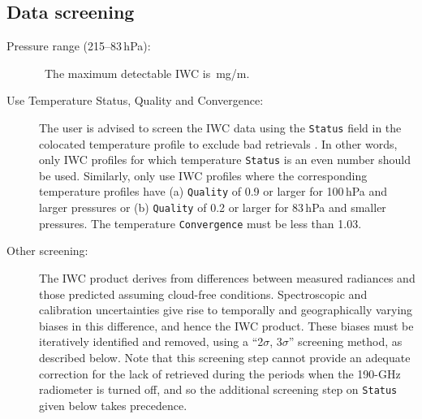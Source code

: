 \begin{nofloatpages}
\subsection{Data screening}
\label{sec:IWCScreening}
\begin{description}
  \item[Pressure range (215--83\,hPa):] \standardrangestatement\ The maximum detectable IWC is \,mg/m.
  \item[Use Temperature Status, Quality and Convergence:] The user is advised to screen the IWC data using the \texttt{Status} field in the colocated temperature profile to exclude bad retrievals \citep{SchwartzEtal:2008:Validation}. In other words, only IWC profiles for which temperature \texttt{Status} is an even number should be used. Similarly, only use IWC profiles where the corresponding temperature profiles have (a) \texttt{Quality} of 0.9 or larger for 100\,hPa and larger pressures or (b) \texttt{Quality} of 0.2 or larger for 83\,hPa and smaller pressures. The temperature \texttt{Convergence} must be less than 1.03.
  \item[Other screening:] The IWC product derives from differences between measured radiances and those predicted assuming cloud-free conditions. Spectroscopic and calibration uncertainties give rise to temporally and geographically varying biases in this difference, and hence the IWC product. These biases must be iteratively identified and removed, using a ``2$\sigma$, $3\sigma$'' screening method, as described below. Note that this screening step cannot provide an adequate correction for the lack of retrieved  during the periods when the \mbox{190\nobreakdash-GHz} radiometer is turned off, and so the additional screening step on  \texttt{Status} given below takes precedence.


\end{description}
\end{nofloatpages}

